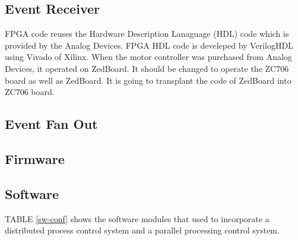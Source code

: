 \documentclass[journal]{IEEEtran}
\begin{document}
\subsection{Event Receiver}
FPGA code reuses the Hardware Description Lanaguage (HDL) code which is provided by the Analog Devices. FPGA HDL code is develeped by VerilogHDL using Vivado of Xilinx. When the motor controller was purchased from Analog Devices, it operated on ZedBoard. It should be changed to operate the ZC706 board as well as ZedBoard. It is going to transplant the code of ZedBoard into ZC706 board.


\subsection{Event Fan Out}

\subsection{Firmware}

\subsection{Software}
\hfill\break
TABLE \ref{sw-conf} shows the software modules that used to incorporate a distributed process control system and a parallel processing control system.
\end{document}
